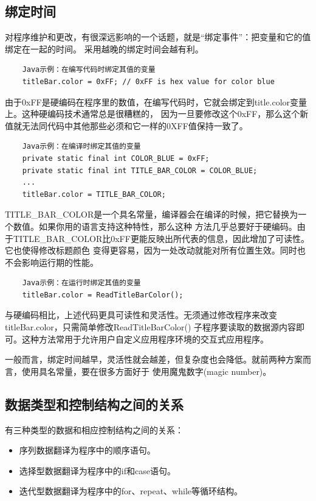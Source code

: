 \documentclass{article}
\begin{document}
\subsection{绑定时间}
对程序维护和更改，有很深远影响的一个话题，就是“绑定事件”：把变量和它的值绑定在一起的时间。
采用越晚的绑定时间会越有利。
\begin{lstlisting}
    Java示例：在编写代码时绑定其值的变量
    titleBar.color = 0xFF; // 0xFF is hex value for color blue
\end{lstlisting}
由于0xFF是硬编码在程序里的数值，在编写代码时，它就会绑定到title.color变量上。这种硬编码技术通常总是很糟糕的，
因为一旦要修改这个0xFF，那么这个新值就无法同代码中其他那些必须和它一样的0XFF值保持一致了。
\begin{lstlisting}
    Java示例：在编译时绑定其值的变量
    private static final int COLOR_BLUE = 0xFF;
    private static final int TITLE_BAR_COLOR = COLOR_BLUE;
    ...
    titleBar.color = TITLE_BAR_COLOR;
\end{lstlisting}
TITLE\_BAR\_COLOR是一个具名常量，编译器会在编译的时候，把它替换为一个数值。如果你用的语言支持这种特性，那么这种
方法几乎总要好于硬编码。由于TITLE\_BAR\_COLOR比0xFF更能反映出所代表的信息，因此增加了可读性。它也使得修改标题颜色
变得更容易，因为一处改动就能对所有位置生效。同时也不会影响运行期的性能。
\begin{lstlisting}
    Java示例：在运行时绑定其值的变量
    titleBar.color = ReadTitleBarColor();
\end{lstlisting}
与硬编码相比，上述代码更具可读性和灵活性。无须通过修改程序来改变titleBar.color，只需简单修改ReadTitleBarColor()
子程序要读取的数据源内容即可。这种方法常用于允许用户自定义应用程序环境的交互式应用程序。
\par
一般而言，绑定时间越早，灵活性就会越差，但复杂度也会降低。就前两种方案而言，使用具名常量，要在很多方面好于
使用魔鬼数字(magic number)。

\subsection{数据类型和控制结构之间的关系}
有三种类型的数据和相应控制结构之间的关系：
\begin{itemize}
    \item 序列数据翻译为程序中的顺序语句。
    \item 选择型数据翻译为程序中的if和case语句。
    \item 迭代型数据翻译为程序中的for、repeat、while等循环结构。
\end{itemize}
\end{document}
